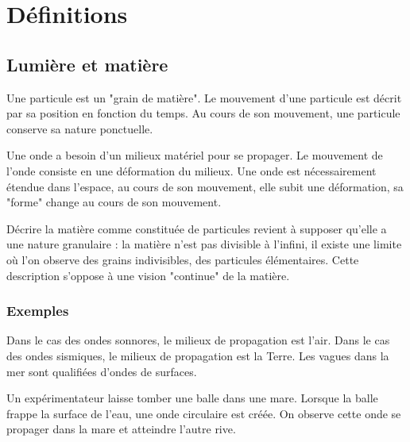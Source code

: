 
\section{Définitions}
%
\subsection{Lumière et matière}

Une particule est un "grain de matière". Le mouvement d'une particule est décrit par sa position en fonction du temps. Au cours de son mouvement, une particule conserve sa nature ponctuelle.


Une onde a besoin d'un milieux matériel pour se propager. Le mouvement de l'onde consiste en une déformation du milieux. Une onde est nécessairement étendue dans l'espace, au cours de son mouvement, elle subit une déformation, sa "forme" change au cours de son mouvement.


Décrire la matière comme constituée de particules revient à supposer qu'elle a une nature granulaire : la matière n'est pas divisible à l'infini, il existe une limite où l'on observe des grains indivisibles, des particules élémentaires. Cette description s'oppose à une vision "continue" de la matière.

\subsubsection{Exemples}

Dans le cas des ondes sonnores, le milieux de propagation est l'air. Dans le cas des ondes sismiques, le milieux de propagation est la Terre. Les vagues dans la mer sont qualifiées d'ondes de surfaces.

\vspace{0.5cm}
\begin{minipage}[c]{.45\linewidth}

\end{minipage}
\hfill
\begin{minipage}[c]{.45\linewidth}
Un expérimentateur laisse tomber une balle dans une mare. Lorsque la balle frappe la surface de l'eau, une onde circulaire est créée. On observe cette onde se propager dans la mare et atteindre l'autre rive.
\end{minipage}

